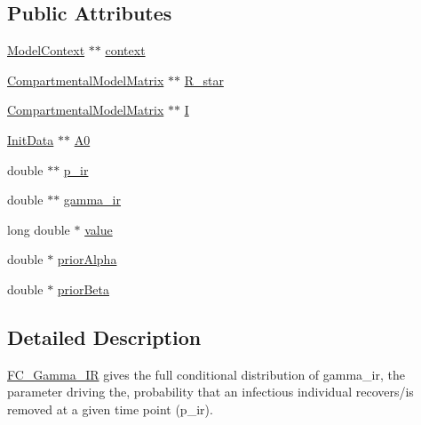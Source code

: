 \subsection*{Public Attributes}
\begin{DoxyCompactItemize}
\item 
\hyperlink{classSpatialSEIR_1_1ModelContext}{Model\-Context} $\ast$$\ast$ \hyperlink{classSpatialSEIR_1_1FC__Gamma__IR_a424028d886dfc9bf9ca5b5e738d42549}{context}
\item 
\hyperlink{classSpatialSEIR_1_1CompartmentalModelMatrix}{Compartmental\-Model\-Matrix} $\ast$$\ast$ \hyperlink{classSpatialSEIR_1_1FC__Gamma__IR_a089d9691a6ae010f883de506686ff813}{R\-\_\-star}
\item 
\hyperlink{classSpatialSEIR_1_1CompartmentalModelMatrix}{Compartmental\-Model\-Matrix} $\ast$$\ast$ \hyperlink{classSpatialSEIR_1_1FC__Gamma__IR_abe3e9d16aa960008aa14709a55972606}{I}
\item 
\hyperlink{classSpatialSEIR_1_1InitData}{Init\-Data} $\ast$$\ast$ \hyperlink{classSpatialSEIR_1_1FC__Gamma__IR_aec7fb5f5d1fa9325c1f6c464d9edd121}{A0}
\item 
double $\ast$$\ast$ \hyperlink{classSpatialSEIR_1_1FC__Gamma__IR_ae1109fa525f1c3a8ceca2f4fbb955bb5}{p\-\_\-ir}
\item 
double $\ast$$\ast$ \hyperlink{classSpatialSEIR_1_1FC__Gamma__IR_a59115dead1bcf07b3839241a27be4c37}{gamma\-\_\-ir}
\item 
long double $\ast$ \hyperlink{classSpatialSEIR_1_1FC__Gamma__IR_ac34f1496de3501478a9915cc8930f56c}{value}
\item 
double $\ast$ \hyperlink{classSpatialSEIR_1_1FC__Gamma__IR_a17f5b19b6b11baa0befae17c2981789c}{prior\-Alpha}
\item 
double $\ast$ \hyperlink{classSpatialSEIR_1_1FC__Gamma__IR_aab39045db2213fef0e91aa5b758d7024}{prior\-Beta}
\end{DoxyCompactItemize}


\subsection{Detailed Description}
\hyperlink{classSpatialSEIR_1_1FC__Gamma__IR}{F\-C\-\_\-\-Gamma\-\_\-\-I\-R} gives the full conditional distribution of gamma\-\_\-ir, the parameter driving the, probability that an infectious individual recovers/is removed at a given time point (p\-\_\-ir). 

